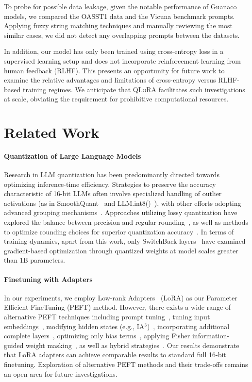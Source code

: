 To probe for possible data leakage, given the notable performance of {Guanaco} models, we compared the OASST1 data and the Vicuna benchmark prompts. Applying fuzzy string matching techniques and manually reviewing the most similar cases, we did not detect any overlapping prompts between the datasets.

In addition, our model has only been trained using cross-entropy loss in a supervised learning setup and does not incorporate reinforcement learning from human feedback (RLHF). This presents an opportunity for future work to examine the relative advantages and limitations of cross-entropy versus RLHF-based training regimes. We anticipate that \textsc{QLoRA} facilitates such investigations at scale, obviating the requirement for prohibitive computational resources.

\section{Related Work}

\paragraph{Quantization of Large Language Models} Research in LLM quantization has been predominantly directed towards optimizing inference-time efficiency. Strategies to preserve the accuracy characteristic of 16-bit LLMs often involve specialized handling of outlier activations (as in SmoothQuant~\citep{xiao2022smoothquant} and LLM.int8()~\citep{dettmers2022llm}), with other efforts adopting advanced grouping mechanisms~\citep{park2022nuqmm, yao2022zeroquant}. Approaches utilizing lossy quantization have explored the balance between precision and regular rounding~\citep{dettmers2022case,zeng2022glm,pope2022efficiently}, as well as methods to optimize rounding choices for superior quantization accuracy~\citep{frantar2022gptq}. In terms of training dynamics, apart from this work, only SwitchBack layers~\citep{wortsman2023stable} have examined gradient-based optimization through quantized weights at model scales greater than 1B parameters.

\paragraph{Finetuning with Adapters} In our experiments, we employ Low-rank Adapters~\citep{hu2021lora} (LoRA) as our Parameter Efficient FineTuning (PEFT) method. However, there exists a wide range of alternative PEFT techniques including prompt tuning~\citep{qin2021learning,lester2021power,li2021prefix}, tuning input embeddings~\citep{an2022input}, modifying hidden states (e.g., IA$^3$)~\citep{liu2022few}, incorporating additional complete layers~\citep{houlsby2019parameter}, optimizing only bias terms~\citep{zaken2021bitfit}, applying Fisher information-guided weight masking~\citep{sung2021training}, as well as hybrid strategies~\citep{henderson2021compacter}. Our results demonstrate that LoRA adapters can achieve comparable results to standard full 16-bit finetuning. Exploration of alternative PEFT methods and their trade-offs remains an open area for future investigations.

